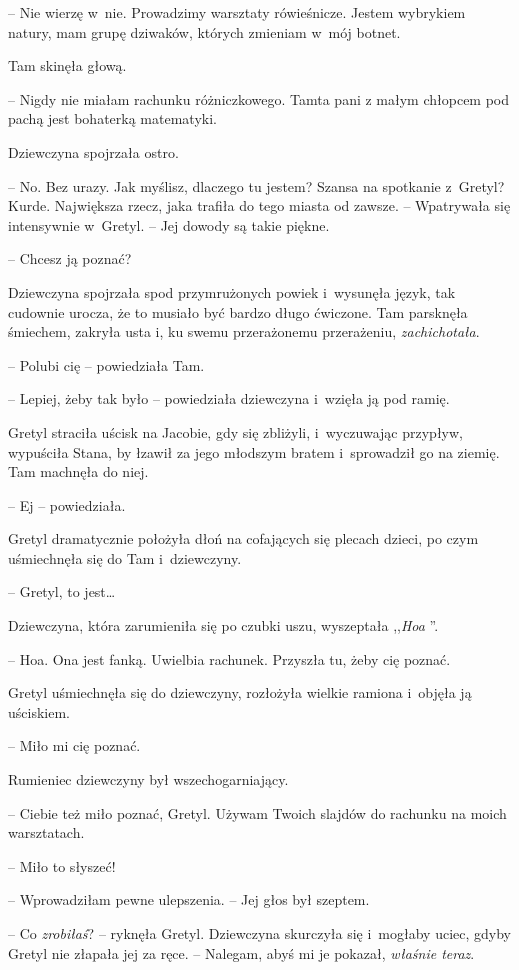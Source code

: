 \documentclass[oneside,polish,11pt,sfheadings]{mwbk}
\begin{document}
-- Nie wierzę w~nie. Prowadzimy warsztaty
rówieśnicze. Jestem wybrykiem natury, mam grupę dziwaków, których
zmieniam w~mój botnet.

Tam skinęła głową. 

-- Nigdy nie miałam rachunku różniczkowego. Tamta pani
z małym chłopcem pod pachą jest bohaterką matematyki.

Dziewczyna spojrzała ostro. 

-- No. Bez urazy. Jak myślisz, dlaczego tu
jestem? Szansa na spotkanie z~Gretyl? Kurde. Największa rzecz, jaka
trafiła do tego miasta od zawsze. -- Wpatrywała się intensywnie w~Gretyl.
-- Jej dowody są takie piękne.

-- Chcesz ją poznać?

Dziewczyna spojrzała spod przymrużonych powiek i~wysunęła język, tak cudownie urocza, że to musiało
być bardzo długo ćwiczone. Tam parsknęła śmiechem, zakryła usta i, ku
swemu przerażonemu przerażeniu, \textit{zachichotała}.

-- Polubi cię -- powiedziała Tam.

-- Lepiej, żeby tak było -- powiedziała dziewczyna i~wzięła ją pod ramię.

Gretyl straciła uścisk na Jacobie, gdy się zbliżyli, i~wyczuwając
przypływ, wypuściła Stana, by łzawił za jego młodszym bratem i~sprowadził go na ziemię. Tam machnęła do niej. 

-- Ej -- powiedziała.

Gretyl dramatycznie położyła dłoń na cofających się plecach dzieci, po
czym uśmiechnęła się do Tam i~dziewczyny.

-- Gretyl, to jest\ldots 

Dziewczyna, która zarumieniła się po czubki uszu, wyszeptała ,,\textit{Hoa
}''.

-- Hoa. Ona jest fanką. Uwielbia rachunek. Przyszła tu, żeby cię poznać.

Gretyl uśmiechnęła się do dziewczyny, rozłożyła wielkie ramiona i~objęła
ją uściskiem. 

-- Miło mi cię poznać.

Rumieniec dziewczyny był wszechogarniający.

-- Ciebie też miło poznać, Gretyl. Używam Twoich slajdów do rachunku na
moich warsztatach.

-- Miło to słyszeć!

-- Wprowadziłam pewne ulepszenia. -- Jej głos był szeptem.

-- Co \textit{zrobiłaś}? -- ryknęła Gretyl. Dziewczyna skurczyła się i~mogłaby uciec, gdyby Gretyl nie złapała jej za ręce. -- Nalegam, abyś mi
je pokazał, \textit{właśnie teraz}.
\end{document}
